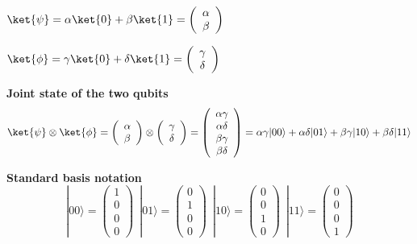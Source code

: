 \documentclass[10pt]{report}
\begin{document}
\begin{list}{}{}
	\item $\ket{\psi} = \alpha\ket{0}+\beta\ket{1} = \left(\begin{array}{c}
	\alpha\\\beta
	\end{array}\right)$
	\item $\ket{\phi} = \gamma\ket{0}+\delta\ket{1} = \left(\begin{array}{c}
	\gamma\\\delta
	\end{array}\right)$
	\item \textbf{Joint state of the two qubits}
	$$\ket{\psi}\otimes\ket{\phi} = \left(\begin{array}{c}
	\alpha\\\beta
	\end{array}\right)\otimes\left(\begin{array}{c}
	\gamma\\\delta
	\end{array}\right) = \left(\begin{array}{c}
	\alpha\gamma\\\alpha\delta\\\beta\gamma\\\beta\delta
	\end{array}\right) = \alpha\gamma|00\rangle + \alpha\delta|01\rangle + \beta\gamma|10\rangle + \beta\delta|11\rangle$$
	\item \textbf{Standard basis notation}
	$$|00\rangle=\left(\begin{array}{c}1\\0\\0\\0\end{array}\right)\:\:|01\rangle=\left(\begin{array}{c}0\\1\\0\\0\end{array}\right)\:\:|10\rangle=\left(\begin{array}{c}0\\0\\1\\0\end{array}\right)\:\:|11\rangle=\left(\begin{array}{c}0\\0\\0\\1\end{array}\right)$$
\end{list}
\end{document}
